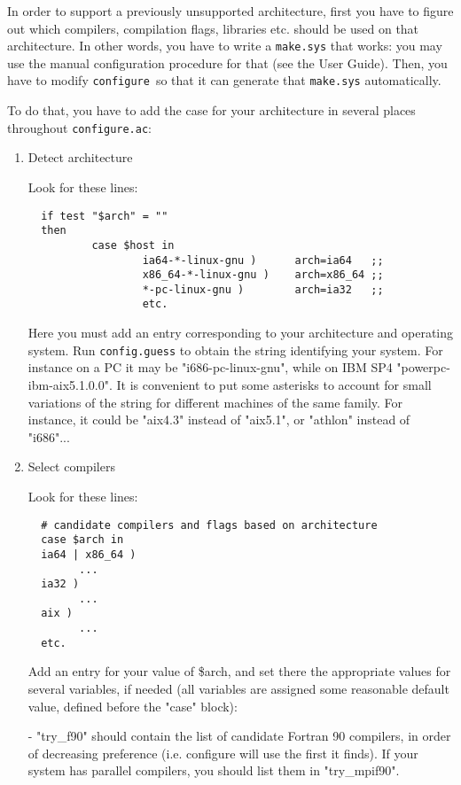 \documentclass[12pt,a4paper]{article}
\def\configure{\texttt{configure}}
\def\configurac{\texttt{configure.ac}}
\begin{document}
In order to support a previously unsupported architecture, first you
have to figure out which compilers, compilation flags, libraries
etc. should be used on that architecture.
In other words, you have to write a \texttt{make.sys} that works: you may use
the manual configuration procedure for that (see the 
User Guide).  Then, you have to modify \configure\ so that it can
generate that \texttt{make.sys} automatically.

To do that, you have to add the case for your architecture in several
places throughout \configurac:
\begin{enumerate}
\item Detect architecture

Look for these lines:
\begin{verbatim}
  if test "$arch" = ""
  then
          case $host in
                  ia64-*-linux-gnu )      arch=ia64   ;;
                  x86_64-*-linux-gnu )    arch=x86_64 ;;
                  *-pc-linux-gnu )        arch=ia32   ;;
                  etc.
\end{verbatim}
Here you must add an entry corresponding to your architecture and
operating system.  Run \texttt{config.guess} to obtain the string identifying
your system.
For instance on a PC it may be "i686-pc-linux-gnu", while on IBM SP4
"powerpc-ibm-aix5.1.0.0".  It is convenient to put some asterisks to
account for small variations of the string for different machines of
the same family.  For instance, it could be "aix4.3" instead of
"aix5.1", or "athlon" instead of "i686"...

\item  Select compilers

Look for these lines:

\begin{verbatim}
  # candidate compilers and flags based on architecture
  case $arch in
  ia64 | x86_64 )
        ...
  ia32 )
        ...
  aix )
        ...
  etc.
\end{verbatim}

Add an entry for your value of \$arch, and set there the appropriate
values for several variables, if needed (all variables are assigned
some reasonable default value, defined before the "case" block):

- "try\_f90" should contain the list of candidate Fortran 90 compilers,
in order of decreasing preference (i.e. configure will use the first
it finds).  If your system has parallel compilers, you should list
them in "try\_mpif90".


\end{enumerate}
\end{document}
